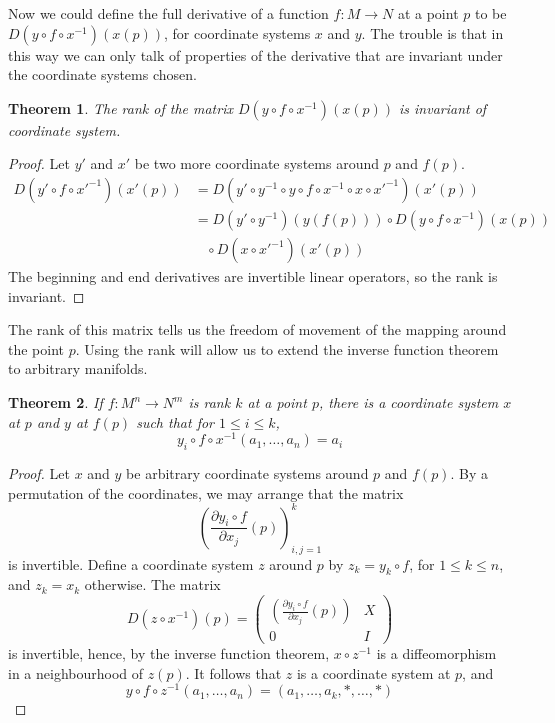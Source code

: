 \documentclass[12pt]{report}
\theoremstyle{plain}
\newtheorem{theorem}{Theorem}[chapter]
\theoremstyle{definition}
\begin{document}
Now we could define the full derivative of a function $f:M \to N$ at a point $p$ to be $D(y \circ f \circ x^{-1})(x(p))$, for coordinate systems $x$ and $y$. The trouble is that in this way we can only talk of properties of the derivative that are invariant under the coordinate systems chosen.

\begin{theorem}
    The rank of the matrix $D(y \circ f \circ x^{-1})(x(p))$ is invariant of coordinate system.
\end{theorem}
\begin{proof}
    Let $y'$ and $x'$ be two more coordinate systems around $p$ and $f(p)$.
    \begin{align*}
        D(y' \circ f \circ x'^{-1})(x'(p)) &= D(y' \circ y^{-1} \circ y \circ f \circ x^{-1} \circ x \circ x'^{-1})(x'(p))\\
        &= D(y' \circ y^{-1})(y(f(p))) \circ D(y \circ f \circ x^{-1})(x(p)) 
        \\ &\ \ \ \ \circ D(x \circ x'^{-1})(x'(p))
    \end{align*}
    The beginning and end derivatives are invertible linear operators, so the rank is invariant.
\end{proof}

The rank of this matrix tells us the freedom of movement of the mapping around the point $p$. Using the rank will allow us to extend the inverse function theorem to arbitrary manifolds.

\begin{theorem}
    If $f:M^n \to N^m$ is rank $k$ at a point $p$, there is a coordinate system $x$ at $p$ and $y$ at $f(p)$ such that for $1 \leq i \leq k$,
    \[ y_i \circ f \circ x^{-1}(a_1, \dots, a_n) = a_i \]
\end{theorem}
\begin{proof}
    Let $x$ and $y$ be arbitrary coordinate systems around $p$ and $f(p)$. By a permutation of the coordinates, we may arrange that the matrix
    \[ \left( \frac{\partial y_i \circ f}{\partial x_j}(p) \right)_{i,j = 1}^k \]
    is invertible. Define a coordinate system $z$ around $p$ by $z_k = y_k \circ f$, for $1 \leq k \leq n$, and $z_k = x_k$ otherwise. The matrix
    \[ D(z \circ x^{-1})(p) = \begin{pmatrix} \left( \frac{\partial y_i \circ f}{\partial x_j}(p) \right) & X \\ 0 & I \end{pmatrix} \]
    is invertible, hence, by the inverse function theorem, $x \circ z^{-1}$ is a diffeomorphism in a neighbourhood of $z(p)$. It follows that $z$ is a coordinate system at $p$, and
    \[ y \circ f \circ z^{-1}(a_1, \dots, a_n) = (a_1, \dots, a_k, *, \dots, *) \]
\end{proof}
\end{document}
